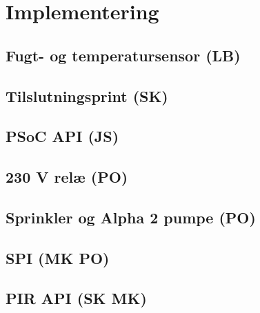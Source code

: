 \chapter{Implementering}

\section{Fugt- og temperatursensor (LB)}


\section{Tilslutningsprint (SK)}


\section{PSoC API (JS)}


\section{230 V relæ (PO)}


\section{Sprinkler og Alpha 2 pumpe (PO)}


\newpage
\section{SPI (MK PO)}


\section{PIR API (SK MK)}




